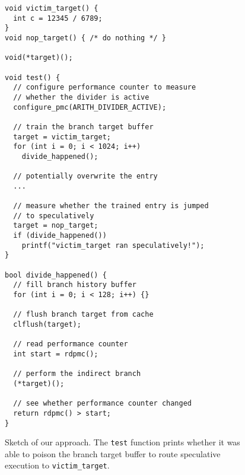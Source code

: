 
\begin{figure}[h]
\begin{lstlisting}
void victim_target() {
  int c = 12345 / 6789;
}
void nop_target() { /* do nothing */ }

void(*target)();

void test() {
  // configure performance counter to measure
  // whether the divider is active
  configure_pmc(ARITH_DIVIDER_ACTIVE);

  // train the branch target buffer
  target = victim_target;
  for (int i = 0; i < 1024; i++)
    divide_happened();

  // potentially overwrite the entry
  ...

  // measure whether the trained entry is jumped
  // to speculatively
  target = nop_target;
  if (divide_happened())
    printf("victim_target ran speculatively!");
}

bool divide_happened() {
  // fill branch history buffer
  for (int i = 0; i < 128; i++) {}

  // flush branch target from cache
  clflush(target);

  // read performance counter
  int start = rdpmc();

  // perform the indirect branch
  (*target)();

  // see whether performance counter changed
  return rdpmc() > start;
}\end{lstlisting}
\caption{Sketch of our approach. The \texttt{test} function prints whether it was able to poison the branch target buffer to route speculative execution to \texttt{victim\_target}.}
\label{fig:spectre2-sample}
\end{figure}


